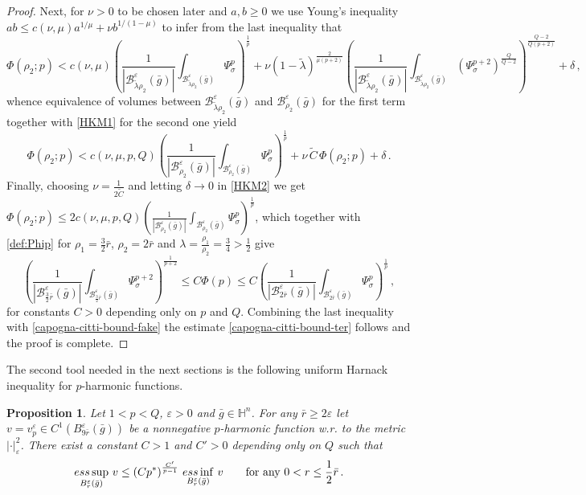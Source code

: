 \documentclass[10pt]{amsart}
\numberwithin{equation}{section}
\newtheorem{proposition}[theorem]{Proposition}
\theoremstyle{definition}
\newcommand{\He}{\mathbb{H}}
\begin{document}
\begin{proof}
Next, for $\nu>0$ to be chosen later and $a,b \geq 0$ we use Young's inequality $ab \leq c(\nu,\mu) a^{1/\mu}+\nu b^{1/(1-\mu)}$ to infer from the last inequality that
\[ \Phi(\rho_2;p) < c(\nu, \mu)  \left( \frac{1}{|\mathcal{B}^\varepsilon_{\tilde{\lambda} \rho_2}(\bar{g})|}\int_{ \mathcal{B}_{ \tilde{\lambda} \rho_2}^\varepsilon(\bar{g})} \Psi_\sigma^p  \right)^{\frac1p}+\nu  (1-\tilde{\lambda})^{\frac{2}{\mu(p+2)}}\left(  \frac{1}{|\mathcal{B}^\varepsilon_{\tilde{\lambda}\rho_2}(\bar{g})|}\int_{\mathcal{B}^\varepsilon_{\tilde{\lambda} \rho_2}(\bar{g})}  \left( \Psi_\sigma^{p+2} \right)^{\frac{Q}{Q-2}} \right)^{\frac{Q-2}{Q(p+2)}} +\delta \, ,\]
whence equivalence of volumes between $\mathcal{B}^\varepsilon_{\tilde{\lambda} \rho_2}(\bar{g})$ and $\mathcal{B}^\varepsilon_{ \rho_2}(\bar{g})$ for the first term together with \eqref{HKM1} for the second one yield
\begin{equation}
\label{HKM2}
\Phi(\rho_2;p) < c(\nu, \mu,p,Q)  \left( \frac{1}{|\mathcal{B}^\varepsilon_{ \rho_2}(\bar{g})|}\int_{ \mathcal{B}_{  \rho_2}^\varepsilon(\bar{g})} \Psi_\sigma^p  \right)^{\frac1p}+\nu  \, \widetilde{C} \,\Phi(\rho_2;p) +\delta \, .
\end{equation}
 Finally, choosing $\nu=\frac{1}{2 \widetilde{C}}$ and letting $\delta \to 0$ in \eqref{HKM2} we get $\Phi(\rho_2;p) \leq 2 c(\nu, \mu,p,Q)  \left( \frac{1}{|\mathcal{B}^\varepsilon_{ \rho_2}(\bar{g})|}\int_{ \mathcal{B}_{  \rho_2}^\varepsilon(\bar{g})} \Psi_\sigma^p  \right)^{\frac1p}$, which together with \eqref{def:Phip} for $\rho_1=\frac32 \bar{r}$, $\rho_2=2\bar{r}$ and $\lambda= \frac{\rho_1}{\rho_2} =\frac34>\frac12$ give
 \[  \left( \frac{1}{|\mathcal{B}^\varepsilon_{\frac32 \bar{r}}(\bar{g})|}\int_{ \mathcal{B}_{ \frac32 \bar{r}}^\varepsilon(\bar{g})} \Psi_\sigma^{p+2}  \right)^{\frac1{p+2}} \leq C \Phi(p) \leq C  \left( \frac{1}{|\mathcal{B}^\varepsilon_{ 2 \bar{r}}(\bar{g})|}\int_{ \mathcal{B}_{  2 \bar{r}}^\varepsilon(\bar{g})} \Psi_\sigma^p  \right)^{\frac1p} \, , \]
 for constants $C>0$ depending only on $p$ and $Q$. Combining the last inequality with \eqref{capogna-citti-bound-fake} the estimate \eqref{capogna-citti-bound-ter} follows and the proof is complete.
 
\end{proof}

The second tool needed in the next sections is the following uniform Harnack inequality for $p$-harmonic functions.

\begin{proposition}
\label{garofalo}
Let $1<p<Q$, $\varepsilon>0$ and $\bar{g} \in \He^n$.  For any $ \bar{r}\geq 2 \varepsilon$ let $v=v^\varepsilon_p \in C^1(B^\varepsilon_{ 9\bar{r}}(\bar{g}))$ be a nonnegative $p$-harmonic function w.r. to the metric $|\cdot |^2_\varepsilon$. There exist a constant $C>1$ and $C'>0$ depending only on $Q$ such that
\begin{equation}
\label{harnack}
\underset{B^\varepsilon_r(\bar{g})}{\rm{ess} \sup} \,\,v \leq \left(C p^* \right)^\frac{C'}{p-1} 	\, \underset{B^\varepsilon_r(\bar{g})}{\rm{ess} \inf} \,\,v \qquad \hbox{for any } 0<r \leq \frac12 \bar{r} \, .
\end{equation}
\end{proposition}
\end{document}
